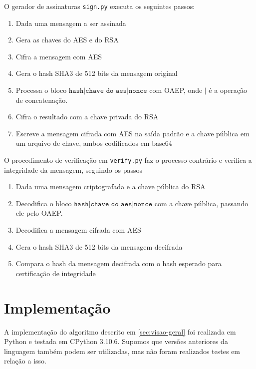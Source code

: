 \documentclass[a4paper, 10.5pt]{article}
\begin{document}
    O gerador de assinaturas \verb|sign.py| executa os seguintes passos:

    \begin{enumerate}
        \item Dada uma mensagem a ser assinada
        \item Gera as chaves do AES e do RSA
        \item Cifra a mensagem com AES
        \item Gera o hash SHA3 de 512 bits da mensagem original
        \item Processa o bloco $\texttt{hash} | \texttt{chave do aes} | \texttt{nonce} $
            com OAEP, onde $|$ é a operação de concatenação.
        \item Cifra o resultado com a chave privada do RSA
        \item Escreve a mensagem cifrada com AES na saída padrão e a chave
            pública em um arquivo de chave, ambos codificados em base64
    \end{enumerate}

    O procedimento de verificação em \verb|verify.py| faz o processo contrário e
    verifica a integridade da mensagem, seguindo os passos

    \begin{enumerate}
        \item Dada uma mensagem criptografada e a chave pública do RSA
        \item Decodifica o bloco $\texttt{hash} | \texttt{chave do aes} | \texttt{nonce} $
            com a chave pública, passando ele pelo OAEP.
        \item Decodifica a mensagem cifrada com AES
        \item Gera o hash SHA3 de 512 bits da mensagem decifrada
        \item Compara o hash da mensagem decifrada com o hash esperado para
            certificação de integridade
    \end{enumerate}

\section{Implementação} %
\label{sec:implementacao}
    A implementação do algoritmo descrito em \ref{sec:visao-geral} foi realizada
    em Python e testada em CPython 3.10.6. Supomos que versões anteriores da linguagem
    também podem ser utilizadas, mas não foram realizados testes em relação a
    isso.
\end{document}
